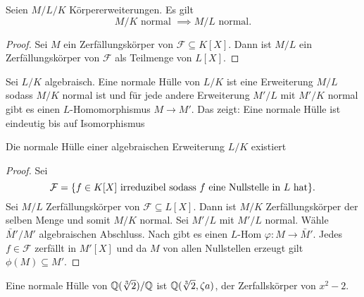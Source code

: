 \begin{Lemma}
    Seien \(M/L/K\) Körpererweiterungen. Es gilt \[M/K \text{ normal }\implies M/L \text{ normal.}\]
\end{Lemma}
\begin{proof}
    Sei \(M\) ein Zerfällungskörper von \(\mathcal{F}\subseteq K[X]\). Dann ist \(M/L\) ein Zerfällungskörper von \(\mathcal F\) als Teilmenge von \(L[X].\)
\end{proof}
\begin{Def}
    Sei \(L/K\) algebraisch. Eine normale Hülle von \(L/K\) ist eine Erweiterung \(M/L\) sodass \(M/K\) normal ist und für jede andere Erweiterung \(M'/L\) mit \(M'/K\) normal gibt es einen \(L\)-Homomorphismus \(M\to M'\). Das zeigt: Eine normale Hülle ist eindeutig bis auf Isomorphismus
\end{Def}
\begin{Satz}
    Die normale Hülle einer algebraischen Erweiterung \(L/K\) existiert
\end{Satz}
\begin{proof}
    Sei \[\mathcal F=\{f\in K[X] \text{ irreduzibel sodass \(f\) eine Nullstelle in \(L\) hat}\}.\] Sei \(M/L\) Zerfällungskörper von \(\mathcal F\subseteq L[X]\). Dann ist \(M/K\) Zerfällungskörper der selben Menge und somit \(M/K\) normal. Sei \(M'/L\) mit \(M'/L\) normal. Wähle \(\bar M'/M'\) algebraischen Abschluss. Nach  gibt es einen \(L\)-Hom \(\varphi\colon M\to\bar M'\). Jedes \(f\in\mathcal F\) zerfällt in \(M'[X]\) und da \(M\) von allen Nullstellen erzeugt gilt \(\phi(M)\subseteq M'\).
\end{proof}
\begin{Bsp}
    Eine normale Hülle von \(\mathbb{Q}(\sqrt[3]{2})/\mathbb{Q}\) ist \(\mathbb{Q}(\sqrt[3]{2},\zeta a)\), der Zerfallskörper von \(x^2-2.\)
\end{Bsp}
